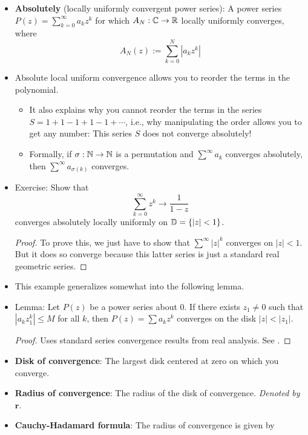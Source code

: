 \documentclass[../notes.tex]{subfiles}
\begin{document}
\begin{itemize}
\begin{itemize}
    \end{itemize}
    \item \textbf{Absolutely} (locally uniformly convergent power series): A power series $P(z)=\sum_{k=0}^\infty a_kz^k$ for which $A_N:\mathbb{C}\to\mathbb{R}$ locally uniformly converges, where
    \begin{equation*}
        A_N(z) := \sum_{k=0}^N|a_kz^k|
    \end{equation*}
    \item Absolute local uniform convergence allows you to reorder the terms in the polynomial.
    \begin{itemize}
        \item It also explains why you cannot reorder the terms in the series $S=1+1-1+1-1+\cdots$, i.e., why manipulating the order allows you to get any number: This series $S$ does not converge absolutely!
        \item Formally, if $\sigma:\mathbb{N}\to\mathbb{N}$ is a permutation and $\sum^\infty a_k$ converges absolutely, then $\sum^\infty a_{\sigma(k)}$ converges.
    \end{itemize}
    \item Exercise: Show that
    \begin{equation*}
        \sum_{k=0}^\infty z^k \to \frac{1}{1-z}
    \end{equation*}
    converges absolutely locally uniformly on $\mathbb{D}=\{|z|<1\}$.
    \begin{proof}
        To prove this, we just have to show that $\sum^\infty|z|^k$ converges on $|z|<1$. But it does so converge because this latter series is just a standard real geometric series.
    \end{proof}
    \item This example generalizes somewhat into the following lemma.
    \item Lemma: Let $P(z)$ be a power series about 0. If there exists $z_1\neq 0$ such that $|a_kz_1^k|\leq M$ for all $k$, then $P(z)=\sum a_kz^k$ converges on the disk $|z|<|z_1|$.
    \begin{proof}
        Uses standard series convergence results from real analysis. See \textcite[15-16]{bib:FischerLieb}.
    \end{proof}
    \item \textbf{Disk of convergence}: The largest disk centered at zero on which you converge.
    \item \textbf{Radius of convergence}: The radius of the disk of convergence. \emph{Denoted by} $\bm{r}$.
    \item \textbf{Cauchy-Hadamard formula}: The radius of convergence is given by

\end{itemize}
\end{document}
